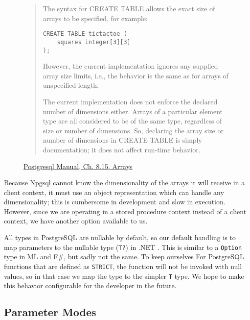 \documentclass[sigconf,techreport,authorversion,nonacm]{acmart}
\newcommand{\dotnet}{.NET }
\begin{document}
\begin{figure}[H]
\captionsetup{labelformat=empty}
\begin{tcolorbox}[width=.5\textwidth,colframe=blue]
\begin{quote}
The syntax for CREATE TABLE allows the exact size of arrays to be
specified, for example:

\begin{verbatim}
CREATE TABLE tictactoe (
    squares integer[3][3]
);
\end{verbatim}

However, the current implementation ignores any supplied array size
limits, i.e., the behavior is the same as for arrays of unspecified
length.

The current implementation does not enforce the declared number of
dimensions either. Arrays of a particular element type are all
considered to be of the same type, regardless of size or number of
dimensions. So, declaring the array size or number of dimensions
in CREATE TABLE is simply documentation; it does not affect run-time
behavior.
\end{quote}
\caption{\href{https://www.postgresql.org/docs/15/arrays.html}{Postgresql Manual, Ch. 8.15, Arrays}}
\end{tcolorbox}
\end{figure}

Because Npgsql cannot know the dimensionality of the arrays it will
receive in a client context, it must use an object representation
which can handle any dimensionality; this is cumbersome in development
and slow in execution. However, since we are operating in a stored
procedure context instead of a client context, we have another
option available to us.

All types in PostgreSQL are nullable by default, so our default handling
is to map parameters to the nullable type (\texttt{T?}) in \dotnet.
This is similar to a \texttt{Option} type in ML and F\#, but sadly not
the same.  To keep ourselves   For PostgreSQL functions that are defined as \texttt{STRICT},
the function will not be invoked with null values, so in that case we map
the type to the simpler \texttt{T} type. We hope to make this behavior
configurable for the developer in the future.

\subsection{Parameter Modes}
\end{document}
